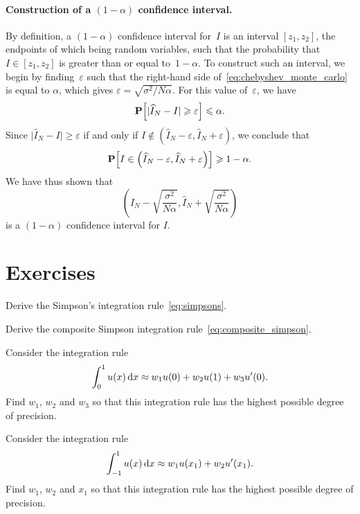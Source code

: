 \paragraph{Construction of a $(1 - \alpha)$ confidence interval.}
By definition,
a $(1 - \alpha)$ confidence interval for~$I$ is
an interval $[z_1, z_2]$,
the endpoints of which being random variables,
such that the probability that $I \in [z_1, z_2]$ is greater than or equal to~$1 - \alpha$.
To construct such an interval,
we begin by finding~$\varepsilon$ such that the right-hand side of~\eqref{eq:chebyshev_monte_carlo} is equal to $\alpha$,
which gives $\varepsilon = \sqrt{\sigma^2 / N \alpha}$.
For this value of~$\varepsilon$,
we have
\[
    \mathbf P\Bigl[\lvert \widehat I_N - I \rvert \geqslant \varepsilon \Bigr] \leqslant \alpha.
\]
Since $\lvert \widehat I_N - I \rvert \geq \varepsilon$ if and only if $I \notin  (\widehat I_N - \varepsilon, \widehat I_N + \varepsilon)$,
we conclude that
\[
    \mathbf P \Bigl[I \in  \left(\widehat I_N - \varepsilon, \widehat I_N + \varepsilon\right) \Bigr]
    \geqslant 1 - \alpha.
\]
We have thus shown that
\[
    \left(\widehat I_N - \sqrt{\frac{\sigma^2}{N \alpha}}, \widehat I_N + \sqrt{\frac{\sigma^2}{N \alpha}}\right)
\]
is a $(1 - \alpha)$ confidence interval for $I$.

\section{Exercises}
\begin{exercise}
    Derive the Simpson's integration rule~\eqref{eq:simpsons}.
\end{exercise}

\begin{exercise}
    \label{exercise:composite_simpson}
    Derive the composite Simpson integration rule~\eqref{eq:composite_simpson}.
\end{exercise}

\begin{exercise}
    Consider the integration rule
    \[
        \int_{0}^{1} u(x) \, \mathrm d x \approx w_1 u(0) + w_2 u(1) + w_3 u'(0).
    \]
    Find $w_1$, $w_2$ and $w_3$ so that this integration rule has the highest possible degree of precision.
\end{exercise}

\begin{exercise}
    Consider the integration rule
    \[
        \int_{-1}^{1} u(x) \, \mathrm d x \approx w_1 u(x_1) + w_2 u'(x_1).
    \]
    Find $w_1$, $w_2$ and $x_1$ so that this integration rule has the highest possible degree of precision.
\end{exercise}

